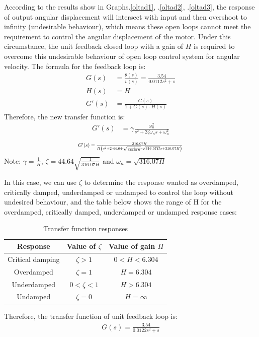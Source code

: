 \documentclass[conference]{IEEEtran}
\begin{document}
According to the results show in Graphs.\ref{oltad1}, .\ref{oltad2}, .\ref{oltad3}, the response of output angular displacement will intersect with input and then overshoot to infinity (undesirable behaviour), which means these open loops cannot meet the requirement to control the angular displacement of the motor. Under this circumstance, the unit feedback closed loop with a gain of $H$ is required to overcome this undesirable behaviour of open loop control system for angular velocity. The formula for the feedback loop is:
\begin{align}
    G(s) &= \frac{\theta (s)}{v(s)} = \frac{3.54}{0.0112s^2 + s}\\
    H(s) &= H\\
    G'(s) &= \frac{G(s)}{1 + G(s) \cdot H(s)}
\end{align}
Therefore, the new transfer function is:
\begin{align}
    G'(s) &= \gamma \frac{\omega_n^2}{s^2 + 2\zeta \omega_n s + \omega_n^2}
\end{align}
\begin{align}
    \resizebox{.43 \textwidth}{!}
    {$
    G'(s) = \frac{316.07H}{H\left( s^2 + 2 \cdot 44.64 \cdot \sqrt{\frac{1}{316.07H}} \cdot \sqrt{316.07 H} s + 316.07 H\right)}
    $}
\end{align}
Note: $\gamma = \frac{1}{H}$, $\zeta = 44.64 \sqrt{\frac{1}{316.07H}}$ and $\omega_n = \sqrt{316.07H}$

In this case, we can use $\zeta$ to determine the response wanted as overdamped, critically damped, underdamped or undamped to control the loop without undesired behaviour, and the table below shows the range of H for the overdamped, critically damped, underdamped or undamped response cases: 
\begin{table}[htbp]
    \caption{Transfer function responses}
    \begin{center}
    \begin{tabular}{|c|c|c|}
    \hline
    \textbf{Response} & \textbf{Value of $\zeta$} & \textbf{Value of gain $H$}\\
    \hline
    \hline
    Critical damping & $\zeta > 1$ & $ 0< H < 6.304$\\
    \hline
    Overdamped & $\zeta = 1$ & $H=6.304$\\
    \hline
    Underdamped & $0<\zeta<1$ & $H > 6.304$\\
    \hline
    Undamped & $\zeta = 0$ & $H = \infty$\\
    \hline
    \end{tabular}
    \label{tfrtable}
    \end{center}
\end{table}
Therefore, the transfer function of unit feedback loop is:
\begin{align}
    G(s) = \frac{3.54}{0.0122s^2 + s}
    \label{tf}
\end{align}
\end{document}
